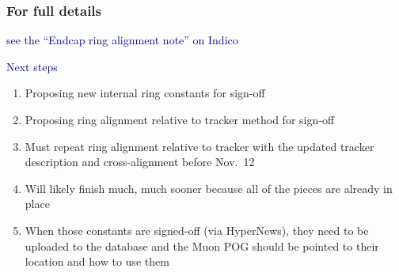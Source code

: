 \documentclass[compress]{beamer}
\begin{document}

\begin{frame}
\frametitle{For full details}

\textcolor{darkblue}{\Large see the ``Endcap ring alignment note'' on Indico}

\vfill
\hspace{-0.83 cm} \textcolor{darkblue}{\Large Next steps}

\vspace{0.2 cm}
\begin{enumerate}
\item Proposing new internal ring constants for sign-off
\item Proposing ring alignment relative to tracker method for sign-off
\item Must repeat ring alignment relative to tracker with the updated
  tracker description and cross-alignment before Nov.~12
\item Will likely finish much, much sooner because all of the pieces
  are already in place
\item When those constants are signed-off (via HyperNews), they need
  to be uploaded to the database and the Muon POG should be pointed to
  their location and how to use them
\end{enumerate}
\label{numpages}
\end{frame}
\end{document}
